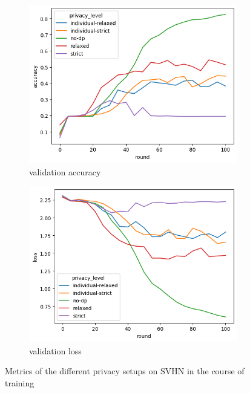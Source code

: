 \begin{figure}
	\centering
	\begin{subfigure}{0.4\textwidth}
		\centering
		\includegraphics[width=\textwidth]{Bilder/svhn-accuracy.png}
		\caption{validation accuracy}
	\end{subfigure}
	\begin{subfigure}{0.4\textwidth}
		\centering
		\includegraphics[width=\textwidth]{Bilder/svhn-loss.png}
		\caption{validation loss}
	\end{subfigure}
	\label{fig:fed-svhn-results}
	\caption{Metrics of the different privacy setups on SVHN in the course of training}
\end{figure}

